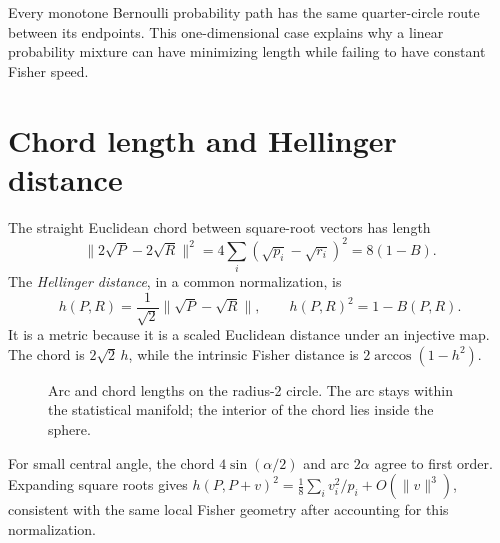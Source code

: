 \documentclass[11pt,oneside,openany]{book}
\theoremstyle{definition}
\theoremstyle{remark}
\numberwithin{equation}{chapter}
\begin{document}
Every monotone Bernoulli probability path has the same quarter-circle route between its endpoints. This one-dimensional case explains why a linear probability mixture can have minimizing length while failing to have constant Fisher speed.

\section{Chord length and Hellinger distance}
The straight Euclidean chord between square-root vectors has length
\begin{equation}\label{eq:chord}
\|2\sqrt P-2\sqrt R\|^2
=4\sum_i(\sqrt{p_i}-\sqrt{r_i})^2=8(1-B).
\end{equation}
The \emph{Hellinger distance}, in a common normalization, is
\[
h(P,R)=\frac1{\sqrt2}\|\sqrt P-\sqrt R\|,
\qquad h(P,R)^2=1-B(P,R).
\]
It is a metric because it is a scaled Euclidean distance under an injective map. The chord is $2\sqrt2\,h$, while the intrinsic Fisher distance is $2\arccos(1-h^2)$.

\begin{figure}[htbp]
\centering
{}
\caption{Arc and chord lengths on the radius-2 circle. The arc stays within the statistical manifold; the interior of the chord lies inside the sphere.}
\end{figure}

For small central angle, the chord $4\sin(\alpha/2)$ and arc $2\alpha$ agree to first order. Expanding square roots gives $h(P,P+v)^2=\tfrac18\sum_i v_i^2/p_i+O(\|v\|^3)$, consistent with the same local Fisher geometry after accounting for this normalization.
\end{document}
